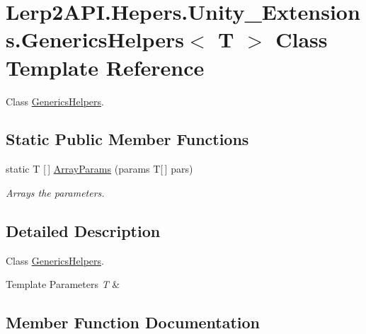 \hypertarget{class_lerp2_a_p_i_1_1_hepers_1_1_unity___extensions_1_1_generics_helpers}{}\section{Lerp2\+A\+P\+I.\+Hepers.\+Unity\+\_\+\+Extensions.\+Generics\+Helpers$<$ T $>$ Class Template Reference}
\label{class_lerp2_a_p_i_1_1_hepers_1_1_unity___extensions_1_1_generics_helpers}


Class \hyperlink{class_lerp2_a_p_i_1_1_hepers_1_1_unity___extensions_1_1_generics_helpers}{Generics\+Helpers}.  


\subsection*{Static Public Member Functions}
\begin{DoxyCompactItemize}
\item 
static T \mbox{[}$\,$\mbox{]} \hyperlink{class_lerp2_a_p_i_1_1_hepers_1_1_unity___extensions_1_1_generics_helpers_ac067fe99b87ce1797d6726c1f4ee4fc9}{Array\+Params} (params T\mbox{[}$\,$\mbox{]} pars)
\begin{DoxyCompactList}\small\item\em Arrays the parameters. \end{DoxyCompactList}\end{DoxyCompactItemize}


\subsection{Detailed Description}
Class \hyperlink{class_lerp2_a_p_i_1_1_hepers_1_1_unity___extensions_1_1_generics_helpers}{Generics\+Helpers}. 


\begin{DoxyTemplParams}{Template Parameters}
{\em T} & \\
\hline
\end{DoxyTemplParams}


\subsection{Member Function Documentation}
\mbox{\label{class_lerp2_a_p_i_1_1_hepers_1_1_unity___extensions_1_1_generics_helpers_ac067fe99b87ce1797d6726c1f4ee4fc9}} 
